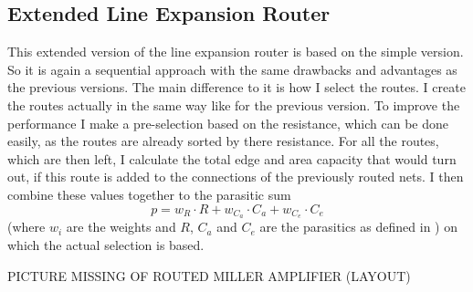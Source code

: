 \subsection{Extended Line Expansion Router}
This extended version of the line expansion router is based on the simple version. So it is again a sequential approach with the same drawbacks and advantages as the previous versions. The main difference to it is how I select the routes. I create the routes actually in the same way like for the previous version. To improve the performance I make a pre-selection based on the resistance, which can be done easily, as the routes are already sorted by there resistance. For all the routes, which are then left, I calculate the total edge and area capacity that would turn out, if this route is added to the connections of the previously routed nets. I then combine these values together to the parasitic sum
\[p = w_R \cdot R + w_{C_a} \cdot C_a + w_{C_e} \cdot C_e\]
(where $w_i$ are the weights and $R$, $C_a$ and $C_e$ are the parasitics as defined in ) on which the actual selection is based.

PICTURE MISSING OF ROUTED MILLER AMPLIFIER (LAYOUT)